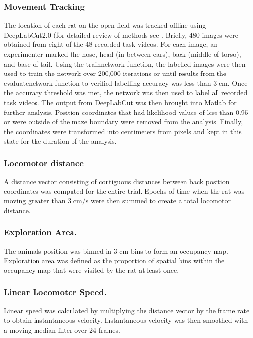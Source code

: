 \documentclass[fleqn,10pt]{wlscirep}
\begin{document}
\subsubsection*{Movement Tracking}The location of each rat on the open field was tracked offline using DeepLabCut2.0 (for detailed review of methods see \cite{mathis_deeplabcut_2018}. Briefly, 480 images were obtained from eight of the 48 recorded task videos. For each image, an experimenter marked the nose, head (in between ears), back (middle of torso), and base of tail. Using the trainnetwork function, the labelled images were then used to train the network over 200,000 iterations or until results from the evaluatenetwork function to verified labelling accuracy was less than 3 cm. Once the accuracy threshold was met, the network was then used to label all recorded task videos. The output from DeepLabCut was then brought into Matlab for further analysis. Position coordinates that had likelihood values of less than $0.95$ or were outside of the maze boundary were removed from the analysis.
Finally, the coordinates were transformed into centimeters from pixels and kept in this state for the duration of the analysis. 

\subsubsection*{Locomotor distance} A distance vector consisting of contiguous distances between back position coordinates was computed for the entire trial. Epochs of time when the rat was moving greater than 3 cm/s were then summed to create a total locomotor distance.  

\subsubsection*{Exploration Area.} The animals position was binned in 3 cm bins to form an occupancy map. Exploration area was defined as the proportion of spatial bins within the occupancy map that were visited by the rat at least once. 

\subsubsection*{Linear Locomotor Speed.} Linear speed was calculated by multiplying the distance vector by the frame rate to obtain instantaneous velocity. Instantaneous velocity was then smoothed with a moving median filter over 24 frames. 
\end{document}
